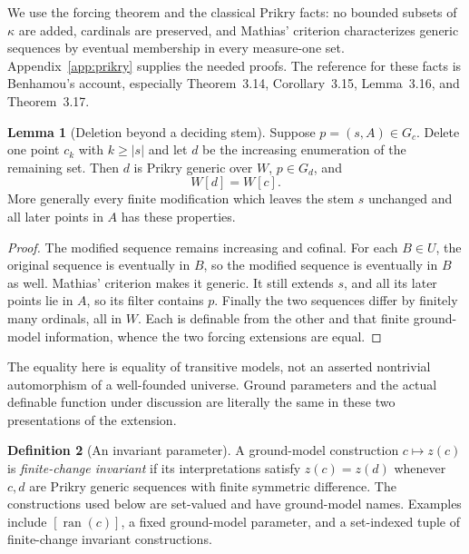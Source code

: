 \documentclass[11pt,letterpaper]{article}
\theoremstyle{definition}
\newtheorem{definition}{Definition}[section]
\newtheorem{lemma}[definition]{Lemma}
\numberwithin{equation}{section}
\begin{document}
We use the forcing theorem and the classical Prikry facts: no bounded subsets of $\kappa$ are added, cardinals are preserved, and Mathias' criterion characterizes generic sequences by eventual membership in every measure-one set. Appendix~\ref{app:prikry} supplies the needed proofs. The reference for these facts is Benhamou's account, especially Theorem~3.14, Corollary~3.15, Lemma~3.16, and Theorem~3.17.\cite{benhamou}

\begin{lemma}[Deletion beyond a deciding stem]\label{lem:deletion}
Suppose $p=(s,A)\in G_c$. Delete one point $c_k$ with $k\ge |s|$ and let $d$ be the increasing enumeration of the remaining set. Then $d$ is Prikry generic over $W$, $p\in G_d$, and
\[
 W[d]=W[c].
\]
More generally every finite modification which leaves the stem $s$ unchanged and all later points in $A$ has these properties.
\end{lemma}
\begin{proof}
The modified sequence remains increasing and cofinal. For each $B\in U$, the original sequence is eventually in $B$, so the modified sequence is eventually in $B$ as well. Mathias' criterion makes it generic. It still extends $s$, and all its later points lie in $A$, so its filter contains $p$. Finally the two sequences differ by finitely many ordinals, all in $W$. Each is definable from the other and that finite ground-model information, whence the two forcing extensions are equal.
\end{proof}

The equality here is equality of transitive models, not an asserted nontrivial automorphism of a well-founded universe. Ground parameters and the actual definable function under discussion are literally the same in these two presentations of the extension.

\begin{definition}[An invariant parameter]\label{def:invariant}
A ground-model construction $c\mapsto z(c)$ is \emph{finite-change invariant} if its interpretations satisfy $z(c)=z(d)$ whenever $c,d$ are Prikry generic sequences with finite symmetric difference. The constructions used below are set-valued and have ground-model names. Examples include $[\operatorname{ran}(c)]$, a fixed ground-model parameter, and a set-indexed tuple of finite-change invariant constructions.
\end{definition}
\end{document}
